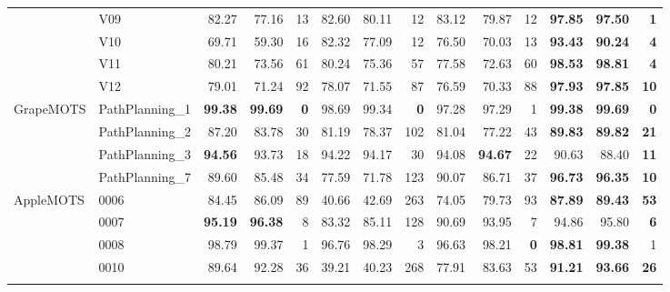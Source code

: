 \documentclass[pdflatex,sn-basic]{sn-jnl}%
\theoremstyle{thmstyleone}%
\begin{document}
\begin{appendices}
\begin{table}
\begin{tabular*}{\textheight}{@{\extracolsep\fill}llrrrrrrrrrrrr@{}}
 & V09 & 82.27 & 77.16 & 13 & 82.60 & 80.11 & 12 & 83.12 & 79.87 & 12 & \textbf{97.85} & \textbf{97.50} & \textbf{1} \\
 & V10 & 69.71 & 59.30 & 16 & 82.32 & 77.09 & 12 & 76.50 & 70.03 & 13 & \textbf{93.43} & \textbf{90.24} & \textbf{4} \\
 & V11 & 80.21 & 73.56 & 61 & 80.24 & 75.36 & 57 & 77.58 & 72.63 & 60 & \textbf{98.53} & \textbf{98.81} & \textbf{4} \\
 & V12 & 79.01 & 71.24 & 92 & 78.07 & 71.55 & 87 & 76.59 & 70.33 & 88 & \textbf{97.93} & \textbf{97.85} & \textbf{10} \\
\midrule
\multirow{4}{*}{GrapeMOTS} & PathPlanning\_1 & \textbf{99.38} & \textbf{99.69} & \textbf{0} & 98.69 & 99.34 & \textbf{0} & 97.28 & 97.29 & 1 & \textbf{99.38} & \textbf{99.69} & \textbf{0} \\
 & PathPlanning\_2 & 87.20 & 83.78 & 30 & 81.19 & 78.37 & 102 & 81.04 & 77.22 & 43 & \textbf{89.83} & \textbf{89.82} & \textbf{21} \\
 & PathPlanning\_3 & \textbf{94.56} & 93.73 & 18 & 94.22 & 94.17 & 30 & 94.08 & \textbf{94.67} & 22 & 90.63 & 88.40 & \textbf{11} \\
 & PathPlanning\_7 & 89.60 & 85.48 & 34 & 77.59 & 71.78 & 123 & 90.07 & 86.71 & 37 & \textbf{96.73} & \textbf{96.35} & \textbf{10} \\
\midrule
\multirow{4}{*}{AppleMOTS} & 0006 & 84.45 & 86.09 & 89 & 40.66 & 42.69 & 263 & 74.05 & 79.73 & 93 & \textbf{87.89} & \textbf{89.43} & \textbf{53} \\
 & 0007 & \textbf{95.19} & \textbf{96.38} & 8 & 83.32 & 85.11 & 128 & 90.69 & 93.95 & 7 & 94.86 & 95.80 & \textbf{6} \\
 & 0008 & 98.79 & 99.37 & 1 & 96.76 & 98.29 & 3 & 96.63 & 98.21 & \textbf{0} & \textbf{98.81} & \textbf{99.38} & 1 \\
 & 0010 & 89.64 & 92.28 & 36 & 39.21 & 40.23 & 268 & 77.91 & 83.63 & 53 & \textbf{91.21} & \textbf{93.66} & \textbf{26} \\
\botrule
\end{tabular*}
\end{table}

\end{appendices}


\end{document}
